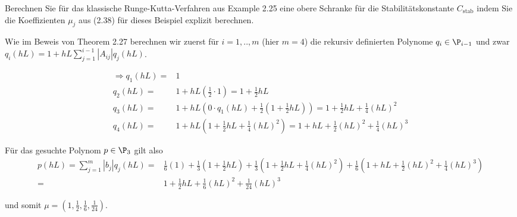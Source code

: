 \begin{exercise}

Berechnen Sie für das klassische Runge-Kutta-Verfahren aus Example 2.25 eine obere Schranke für die Stabilitätskonstante $C_\text{stab}$ indem Sie die Koeffizienten $\mu_{j}$ aus (2.38) für dieses Beispiel explizit berechnen.

\end{exercise}

\begin{solution}

Wie im Beweis von Theorem 2.27 berechnen wir zuerst für $i=1,..,m$ (hier $m=4$) die rekursiv definierten Polynome $q_{i} \in \P_{i-1}$ und zwar $q_{i}(hL)= 1 + hL\sum_{j=1}^{i-1}|A_{ij}|q_{j}(hL)$.

\begin{align*}
    \Rightarrow q_{1}(hL) =& 1 \\
    q_{2}(hL) =& 1 + hL(\frac{1}{2} \cdot 1) = 1 + \frac{1}{2}hL \\
     q_{3}(hL) =& 1 + hL(0 \cdot q_{1}(hL) + \frac{1}{2}(1+\frac{1}{2}hL)) = 1 + \frac{1}{2}hL + \frac{1}{4}(hL)^{2} \\
     q_{4}(hL) =& 1 + hL(1 + \frac{1}{2}hL + \frac{1}{4}(hL)^{2}) = 1 + hL + \frac{1}{2}(hL)^{2} + \frac{1}{4}(hL)^{3}
\end{align*}

Für das gesuchte Polynom $p \in \P_{3}$ gilt also
 \begin{align*}
     p(hL) = \sum_{j=1}^{m}|b_{j}|q_{j}(hL) =& \frac{1}{6}(1) + \frac{1}{3}(1 + \frac{1}{2}hL) + \frac{1}{3}(1 + \frac{1}{2}hL + \frac{1}{4}(hL)^{2}) + \frac{1}{6}(1 + hL + \frac{1}{2}(hL)^{2} + \frac{1}{4}(hL)^{3})  \\
     =& 1 + \frac{1}{2}hL + \frac{1}{6}(hL)^{2} + \frac{1}{24}(hL)^{3}
 \end{align*}

 und somit $\mu = (1,\frac{1}{2},\frac{1}{6},\frac{1}{24})$.

\end{solution}
